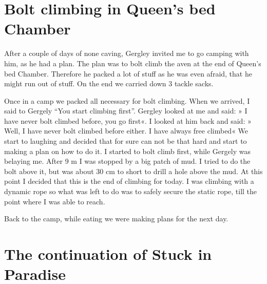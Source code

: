 \attrib{\izi}

\hypertarget{bolt-climbing-in-queens-bed-chamber}{%
\section{Bolt climbing in Queen's bed
Chamber}\label{bolt-climbing-in-queens-bed-chamber}}

After a couple of days of none caving, Gergley invited me to go camping
with him, as he had a plan. The plan was to bolt climb the aven at the
end of Queen's bed Chamber. Therefore he packed a lot of stuff as he was
even afraid, that he might run out of stuff. On the end we carried down
3 tackle sacks.

Once in a camp we packed all necessary for bolt climbing. When we
arrived, I said to Gergely ``You start climbing first''. Gergley looked
at me and said: » I have never bolt climbed before, you go first«. I
looked at him back and said: » Well, I have never bolt climbed before
either. I have always free climbed« We start to laughing and decided
that for sure can not be that hard and start to making a plan on how to
do it. I started to bolt climb first, while Gergely was belaying me.
After 9 m I was stopped by a big patch of mud. I tried to do the bolt
above it, but was about 30 cm to short to drill a hole above the mud. At
this point I decided that this is the end of climbing for today. I was
climbing with a dynamic rope so what was left to do was to safely secure
the static rope, till the point where I was able to reach.

Back to the camp, while eating we were making plans for the next day.

\attrib{\izi}

\hypertarget{the-continuation-of-stuck-in-paradise}{%
\section{The continuation of Stuck in
Paradise}\label{the-continuation-of-stuck-in-paradise}}

